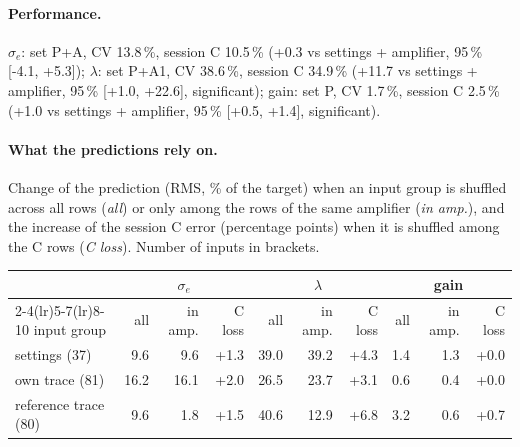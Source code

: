\paragraph{Performance.}
$\sigma_e$: set P+A, CV 13.8\,\%, session C 10.5\,\% (+0.3 vs settings + amplifier, 95\,\% [-4.1, +5.3]); $\lambda$: set P+A1, CV 38.6\,\%, session C 34.9\,\% (+11.7 vs settings + amplifier, 95\,\% [+1.0, +22.6], significant); gain: set P, CV 1.7\,\%, session C 2.5\,\% (+1.0 vs settings + amplifier, 95\,\% [+0.5, +1.4], significant).
\paragraph{What the predictions rely on.} Change of the prediction (RMS, \% of the target) when an input group is shuffled across all rows (\emph{all}) or only among the rows of the same amplifier (\emph{in amp.}), and the increase of the session C error (percentage points) when it is shuffled among the C rows (\emph{C loss}). Number of inputs in brackets.
\begin{center}\footnotesize
\begin{tabular}{lrrrrrrrrr}
\toprule
 & \multicolumn{3}{c}{$\sigma_e$} & \multicolumn{3}{c}{$\lambda$} & \multicolumn{3}{c}{gain} \\
\cmidrule(lr){2-4}\cmidrule(lr){5-7}\cmidrule(lr){8-10}
input group & all & in amp. & C loss & all & in amp. & C loss & all & in amp. & C loss \\
\midrule
settings (37) & 9.6 & 9.6 & +1.3 & 39.0 & 39.2 & +4.3 & 1.4 & 1.3 & +0.0 \\
own trace (81) & 16.2 & 16.1 & +2.0 & 26.5 & 23.7 & +3.1 & 0.6 & 0.4 & +0.0 \\
reference trace (80) & 9.6 & 1.8 & +1.5 & 40.6 & 12.9 & +6.8 & 3.2 & 0.6 & +0.7 \\
\bottomrule
\end{tabular}
\end{center}

